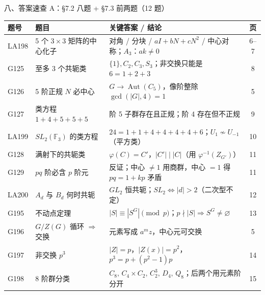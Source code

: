 \documentclass[aspectratio=169,10pt,fontset=none]{ctexbeamer}
\begin{document}
\begin{frame}[t]{八、答案速查 A：\S7.2 八题 + \S7.3 前两题（12 题）}
  \centering
  \scriptsize
  \renewcommand{\arraystretch}{1.16}
  \setlength{\tabcolsep}{3pt}
  \begin{tabular}{@{}l l l c@{}}
    \toprule
    题号 & 题目 & 关键答案 / 结论 & 页\\
    \midrule
    LA198 & 5 个 $3\times3$ 矩阵的中心化子 & 对角 / 分块 / $aI+bN+cN^2$ / 中心对称；$A_3$：$ak\ne0$ & 6--7\\
    G125 & 至多 3 个共轭类 & $\{1\},C_2,C_3,S_3$；非交换只能是 $6=1+2+3$ & 8\\
    G126 & 5 阶正规 $N$ 必中心 & $G\to\operatorname{Aut}(C_5)$，像阶整除 $\gcd(|G|,4)=1$ & 5\\
    G127 & 类方程 $1+4+5+5+5$ & 阶 5 子群存在且正规；阶 4 存在但不正规 & 9\\
    LA199 & $SL_2(\mathbb F_3)$ 的类方程 & $24=1+1+4+4+4+4+6$；$U_1\nsim U_{-1}$（平方类） & 10\\
    G128 & 满射下的共轭类 & $\varphi(C)=C'$，$|C'|\mid|C|$（用 $\varphi^{-1}(Z_{G'})$） & 11\\
    G129 & $pq$ 阶必含 $p$ 阶元 & 反证；中心 $\ne1$ 用商群，中心 $=1$ 得 $pq=1+kp$ 矛盾 & 11\\
    LA200 & $A_d$ 与 $B_d$ 何时共轭 & $GL_2$ 恒共轭；$SL_2\iff |d|>2$（二次型不定） & 12\\
    G195 & 不动点定理 & $|S|\equiv|S^G|\pmod p$；$p\nmid|S|\Rightarrow S^G\ne\varnothing$ & 13\\
    G196 & $G/Z(G)$ 循环 $\Rightarrow$ 交换 & 元素写成 $a^m z$，中心元可交换 & 5\\
    G197 & 非交换 $p^3$ & $|Z|=p$，$|Z(x)|=p^2$，$p^3=p+(p^2-1)p$ & 14\\
    G198 & 8 阶群分类 & $C_8,\,C_4\times C_2,\,C_2^3,\,D_4,\,Q_8$；后两个用元素阶分开 & 15\\
    \bottomrule
  \end{tabular}
\end{frame}
\end{document}
